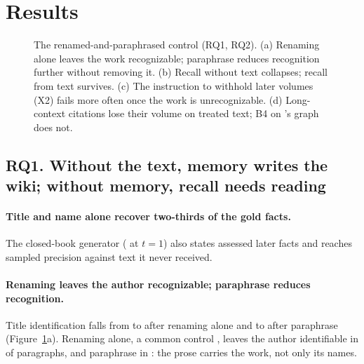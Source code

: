 \section{Results}
\label{sec:results}

\begin{figure}[t]
\centering
\resizebox{\textwidth}{!}{}
\caption{The renamed-and-paraphrased control (RQ1, RQ2). (a) Renaming alone leaves the
work recognizable; paraphrase reduces recognition further without removing it. (b) Recall without text collapses; recall
from text survives. (c) The instruction to withhold later volumes (X2) fails more often once
the work is unrecognizable. (d) Long-context citations lose their volume on treated text; B4
on \sys's graph does not.}
\label{fig:control}
\end{figure}

\subsection{RQ1. Without the text, memory writes the wiki; without memory, recall needs reading}
\label{sec:results-decon}

\paragraph{Title and name alone recover two-thirds of the gold facts.}
The closed-book generator ( at $t=1$) also states
 assessed later facts and reaches sampled precision
 against text it never received.

\paragraph{Renaming leaves the author recognizable; paraphrase reduces recognition.}
Title identification falls from  to  after
renaming alone and to  after paraphrase (Figure~\ref{fig:control}a).
Renaming alone, a common control \citep{gupta2025whodunit,zhang2024infinitebench}, leaves
the author identifiable in  of paragraphs, and paraphrase in
: the prose carries the work, not only its names.

